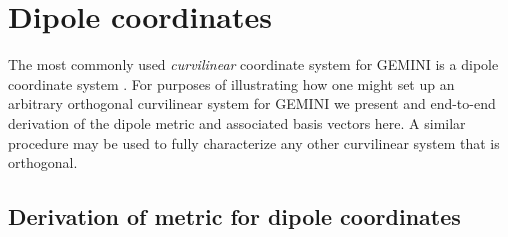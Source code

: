 \documentclass[11pt,letterpaper]{article}
\begin{document}
\section{Dipole coordinates}

The most commonly used \emph{curvilinear} coordinate system for GEMINI is a dipole coordinate system \citep{Huba:2000}.  For purposes of illustrating how one might set up an arbitrary orthogonal curvilinear system for GEMINI we present and end-to-end derivation of the dipole metric and associated basis vectors here.  A similar procedure may be used to fully characterize any other curvilinear system that is orthogonal.  


\subsection{Derivation of metric for dipole coordinates}
\end{document}
